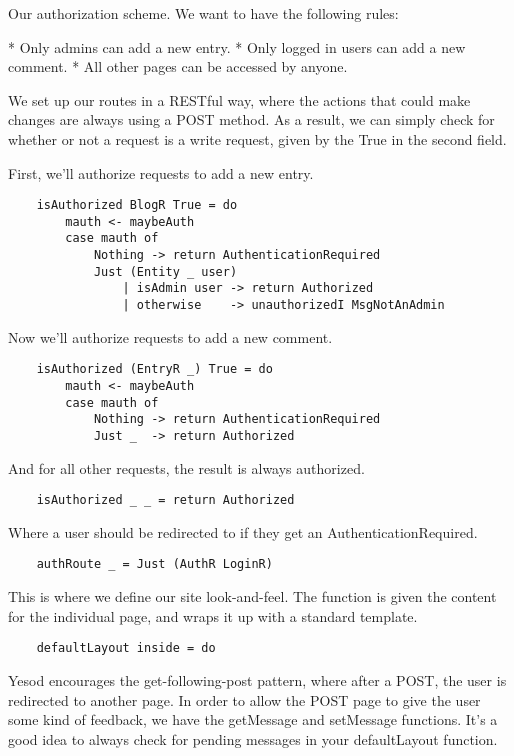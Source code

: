 Our authorization scheme. We want to have the following rules:

* Only admins can add a new entry.
* Only logged in users can add a new comment.
* All other pages can be accessed by anyone.

We set up our routes in a RESTful way, where the actions that could make changes are always using a POST method. As a result, we can simply check for whether or not a request is a write request, given by the True in the second field.

First, we'll authorize requests to add a new entry.

\begin{lstlisting}
    isAuthorized BlogR True = do
        mauth <- maybeAuth
        case mauth of
            Nothing -> return AuthenticationRequired
            Just (Entity _ user)
                | isAdmin user -> return Authorized
                | otherwise    -> unauthorizedI MsgNotAnAdmin
\end{lstlisting}

Now we'll authorize requests to add a new comment.

\begin{lstlisting}
    isAuthorized (EntryR _) True = do
        mauth <- maybeAuth
        case mauth of
            Nothing -> return AuthenticationRequired
            Just _  -> return Authorized
\end{lstlisting}

And for all other requests, the result is always authorized.

\begin{lstlisting}
    isAuthorized _ _ = return Authorized
\end{lstlisting}

Where a user should be redirected to if they get an AuthenticationRequired.

\begin{lstlisting}
    authRoute _ = Just (AuthR LoginR)
\end{lstlisting}

This is where we define our site look-and-feel. The function is given the content for the individual page, and wraps it up with a standard template.

\begin{lstlisting}
    defaultLayout inside = do
\end{lstlisting}

Yesod encourages the get-following-post pattern, where after a POST, the user is redirected to another page. In order to allow the POST page to give the user some kind of feedback, we have the getMessage and setMessage functions. It's a good idea to always check for pending messages in your defaultLayout function.

